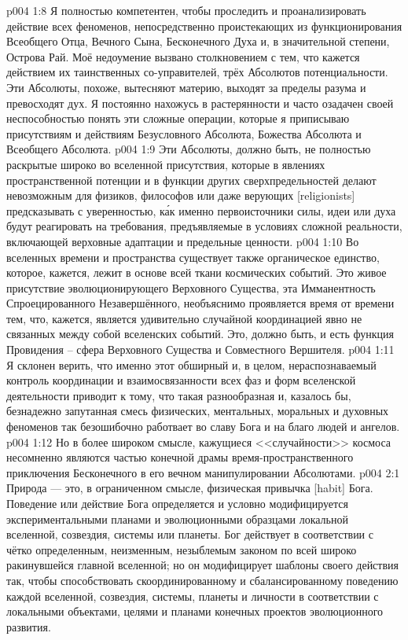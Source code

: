\vs p004 1:8 Я полностью компетентен, чтобы проследить и проанализировать действие всех феноменов, непосредственно проистекающих из функционирования Всеобщего Отца, Вечного Сына, Бесконечного Духа и, в значительной степени, Острова Рай. Моё недоумение вызвано столкновением с тем, что кажется действием их таинственных со\hyp{}управителей, трёх Абсолютов потенциальности. Эти Абсолюты, похоже, вытесняют материю, выходят за пределы разума и превосходят дух. Я постоянно нахожусь в растерянности и часто озадачен своей неспособностью понять эти сложные операции, которые я приписываю присутствиям и действиям Безусловного Абсолюта, Божества Абсолюта и Всеобщего Абсолюта.
\vs p004 1:9 Эти Абсолюты, должно быть, не полностью раскрытые широко во вселенной присутствия, которые в явлениях пространственной потенции и в функции других сверхпредельностей делают невозможным для физиков, философов или даже верующих [religionists] предсказывать с уверенностью, к\'ак именно первоисточники силы, идеи или духа будут реагировать на требования, предъявляемые в условиях сложной реальности, включающей верховные адаптации и предельные ценности.
\vs p004 1:10 \pc Во вселенных времени и пространства существует также органическое единство, которое, кажется, лежит в основе всей ткани космических событий. Это живое присутствие эволюционирующего Верховного Существа, эта Имманентность Спроецированного Незавершённого, необъяснимо проявляется время от времени тем, что, кажется, является удивительно случайной координацией явно не связанных между собой вселенских событий. Это, должно быть, и есть функция Провидения -- сфера Верховного Существа и Совместного Вершителя.
\vs p004 1:11 Я склонен верить, что именно этот обширный и, в целом, нераспознаваемый контроль координации и взаимосвязанности всех фаз и форм вселенской деятельности приводит к тому, что такая разнообразная и, казалось бы, безнадежно запутанная смесь физических, ментальных, моральных и духовных феноменов так безошибочно работвает во славу Бога и на благо людей и ангелов.
\vs p004 1:12 Но в более широком смысле, кажущиеся <<случайности>> космоса несомненно являются частью конечной драмы время\hyp{}пространственного приключения Бесконечного в его вечном манипулировании Абсолютами.
\vs p004 2:1 Природа --- это, в ограниченном смысле, физическая привычка [habit] Бога. Поведение или действие Бога определяется и условно модифицируется экспериментальными планами и эволюционными образцами локальной вселенной, созвездия, системы или планеты. Бог действует в соответствии с чётко определенным, неизменным, незыблемым законом по всей широко ракинувшейся главной вселенной; но он модифицирует шаблоны своего действия так, чтобы способствовать скоординированному и сбалансированному поведению каждой вселенной, созвездия, системы, планеты и личности в соответствии с локальными объектами, целями и планами конечных проектов эволюционного развития.
